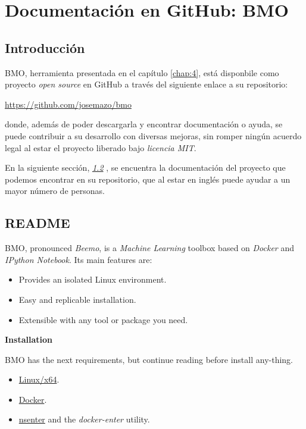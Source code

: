 \chapter{Documentación en GitHub: BMO} \label{chap:ap_a}

\vspace*{5mm}

\section{Introducción} \label{sec:a.1}

BMO, herramienta presentada en el capítulo \ref{chap:4}, está disponbile como proyecto \emph{open source} en GitHub a través del siguiente enlace a su repositorio:

\url{https://github.com/josemazo/bmo}

\noindent
donde, además de poder descargarla y encontrar documentación o ayuda, se puede contribuir a su desarrollo con diversas mejoras, sin romper ningún acuerdo legal al estar el proyecto liberado bajo \emph{licencia MIT}.

En la siguiente sección, \emph{\ref{sec:a.2} }, se encuentra la documentación del proyecto que podemos encontrar en su repositorio, que al estar en inglés puede ayudar a un mayor número de personas.

\section{README} \label{sec:a.2}

BMO, pronounced \emph{Beemo}, is a \emph{Machine Learning} toolbox based on \emph{Docker} and \emph{IPython Notebook}. Its main features are:

\begin{itemize}
\item[\textbullet]Provides an isolated Linux environment.
\item[\textbullet]Easy and replicable installation.
\item[\textbullet]Extensible with any tool or package you need.
\end{itemize}

\Large
\textbf{Installation}

\normalsize
BMO has the next requirements, but continue reading before install any-thing.

\begin{itemize}
\item[\textbullet]\href{http://distrowatch.com/dwres.php?resource=major}{Linux/x64}.
\item[\textbullet]\href{https://www.docker.com/}{Docker}.
\item[\textbullet]\href{https://github.com/jpetazzo/nsenter}{nsenter} and the \emph{docker-enter} utility.
\end{itemize}

